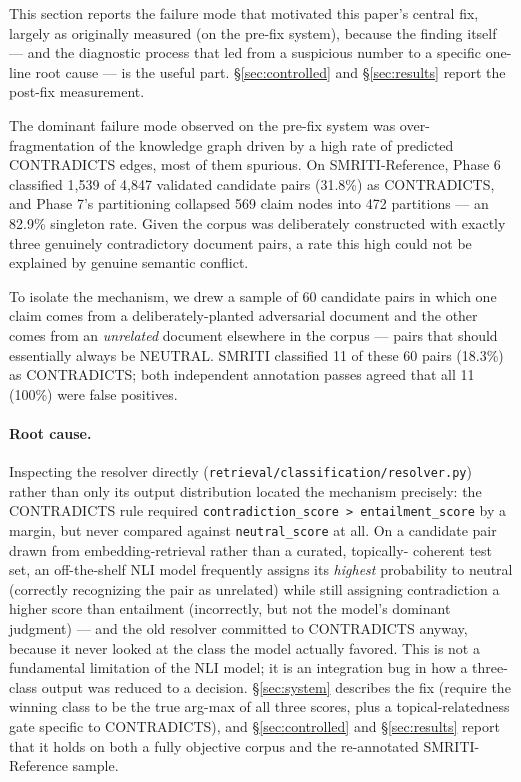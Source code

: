 This section reports the failure mode that motivated this paper's central
fix, largely as originally measured (on the pre-fix system), because the
finding itself --- and the diagnostic process that led from a suspicious
number to a specific one-line root cause --- is the useful part.
\S\ref{sec:controlled} and \S\ref{sec:results} report the post-fix
measurement.

The dominant failure mode observed on the pre-fix system was
over-fragmentation of the knowledge graph driven by a high rate of
predicted CONTRADICTS edges, most of them spurious. On SMRITI-Reference,
Phase 6 classified 1{,}539 of 4{,}847 validated candidate pairs (31.8\%)
as CONTRADICTS, and Phase 7's partitioning collapsed 569 claim nodes into
472 partitions --- an 82.9\% singleton rate. Given the corpus was
deliberately constructed with exactly three genuinely contradictory
document pairs, a rate this high could not be explained by genuine
semantic conflict.

To isolate the mechanism, we drew a sample of 60 candidate pairs in which
one claim comes from a deliberately-planted adversarial document and the
other comes from an \emph{unrelated} document elsewhere in the corpus ---
pairs that should essentially always be NEUTRAL. SMRITI classified 11 of
these 60 pairs (18.3\%) as CONTRADICTS; both independent annotation passes
agreed that all 11 (100\%) were false positives.

\paragraph{Root cause.} Inspecting the resolver directly
(\texttt{retrieval/classification/resolver.py}) rather than only its
output distribution located the mechanism precisely: the CONTRADICTS rule
required \texttt{contradiction\_score > entailment\_score} by a margin,
but never compared against \texttt{neutral\_score} at all. On a candidate
pair drawn from embedding-retrieval rather than a curated, topically-
coherent test set, an off-the-shelf NLI model frequently assigns its
\emph{highest} probability to neutral (correctly recognizing the pair as
unrelated) while still assigning contradiction a higher score than
entailment (incorrectly, but not the model's dominant judgment) --- and the
old resolver committed to CONTRADICTS anyway, because it never looked at
the class the model actually favored. This is not a fundamental limitation
of the NLI model; it is an integration bug in how a three-class output was
reduced to a decision. \S\ref{sec:system} describes the fix (require the
winning class to be the true arg-max of all three scores, plus a
topical-relatedness gate specific to CONTRADICTS), and \S\ref{sec:controlled}
and \S\ref{sec:results} report that it holds on both a fully objective
corpus and the re-annotated SMRITI-Reference sample.

